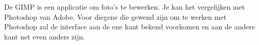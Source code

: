 De GIMP is een applicatie om foto's te bewerken. Je kan het vergelijken met Photoshop van Adobe. Voor diegene die gewend
zijn om te werken met Photoshop zal de interface aan de ene kant bekend voorkomen en aan de andere kant net even anders
zijn.
